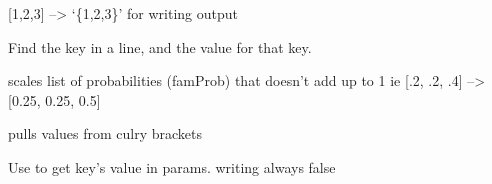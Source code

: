 \documentclass[letterpaper,10pt,english]{sphinxmanual}
\begin{document}
\begin{fulllineitems}

\begin{fulllineitems}
\label{pydfnworks:pydfnworks.helper.input_helper.list_to_curly}
{[}1,2,3{]} --\textgreater{} `\{1,2,3\}'   for writing output

\end{fulllineitems}


\begin{fulllineitems}
\label{pydfnworks:pydfnworks.helper.input_helper.process_line}
Find the key in a line, and the value for that key.

\end{fulllineitems}


\begin{fulllineitems}
\label{pydfnworks:pydfnworks.helper.input_helper.scale}
scales list of probabilities (famProb) that doesn't add up to 1
ie {[}.2, .2, .4{]} --\textgreater{} {[}0.25, 0.25, 0.5{]}

\end{fulllineitems}


\begin{fulllineitems}
\label{pydfnworks:pydfnworks.helper.input_helper.val_helper}
pulls values from culry brackets

\end{fulllineitems}


\begin{fulllineitems}
\label{pydfnworks:pydfnworks.helper.input_helper.value_of}
Use to get key's value in params. writing always false

\end{fulllineitems}


\end{fulllineitems}
\end{document}
